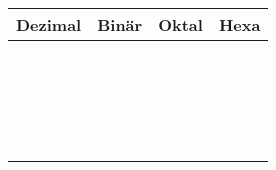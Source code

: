 \documentclass[a5paper]{article}
\begin{document}

\newcommand{\printcntr}{%
  \stepcounter{mycounter}%
  \padzeroes[2]{\decimal{mycounter}}     &
  \padzeroes[4]{\binary{mycounter}}      &
  \padzeroes[3]{\octal{mycounter}}       &
  \padzeroes[3]{\HEXADecimal{mycounter}} %
}

\begin{tabular}{@{}cccc}
  \textbf{Dezimal} & \textbf{Binär} & \textbf{Oktal} & \textbf{Hexa} \\ \hline
  \printcntr \\ \printcntr \\ \printcntr \\ \printcntr \\ \printcntr \\
  \printcntr \\ \printcntr \\ \printcntr \\ \printcntr \\ \printcntr \\
  \printcntr \\ \printcntr \\ \printcntr \\ \printcntr \\ \printcntr \\
  \printcntr \\ \printcntr \\ \printcntr \\ \printcntr \\ \printcntr 
\end{tabular}  
\end{document}
